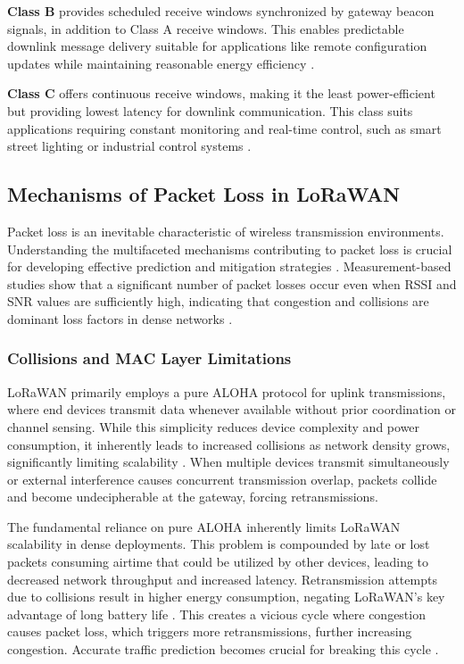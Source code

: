\documentclass[12pt,a4paper]{article}
\begin{document}
\textbf{Class B} provides scheduled receive windows synchronized by gateway beacon signals, in addition to Class A receive windows. This enables predictable downlink message delivery suitable for applications like remote configuration updates while maintaining reasonable energy efficiency \cite{Raza17}.

\textbf{Class C} offers continuous receive windows, making it the least power-efficient but providing lowest latency for downlink communication. This class suits applications requiring constant monitoring and real-time control, such as smart street lighting or industrial control systems \cite{Raza17, leonardi}.

\subsection{Mechanisms of Packet Loss in LoRaWAN}

Packet loss is an inevitable characteristic of wireless transmission environments. Understanding the multifaceted mechanisms contributing to packet loss is crucial for developing effective prediction and mitigation strategies \cite{zheng2025effects}. Measurement-based studies show that a significant number of packet losses occur even when RSSI and SNR values are sufficiently high, indicating that congestion and collisions are dominant loss factors in dense networks \cite{Liu-characterizing}.

\subsubsection{Collisions and MAC Layer Limitations}

LoRaWAN primarily employs a pure ALOHA protocol for uplink transmissions, where end devices transmit data whenever available without prior coordination or channel sensing. While this simplicity reduces device complexity and power consumption, it inherently leads to increased collisions as network density grows, significantly limiting scalability \cite{Guerrero-towards-dependable}. When multiple devices transmit simultaneously or external interference causes concurrent transmission overlap, packets collide and become undecipherable at the gateway, forcing retransmissions.

The fundamental reliance on pure ALOHA inherently limits LoRaWAN scalability in dense deployments. This problem is compounded by late or lost packets consuming airtime that could be utilized by other devices, leading to decreased network throughput and increased latency. Retransmission attempts due to collisions result in higher energy consumption, negating LoRaWAN's key advantage of long battery life \cite{MachineQ2025_LoRaWAN_Reliability}. This creates a vicious cycle where congestion causes packet loss, which triggers more retransmissions, further increasing congestion. Accurate traffic prediction becomes crucial for breaking this cycle \cite{Tabatowski-Bush2024LoRaWANWarehouse}.
\end{document}
